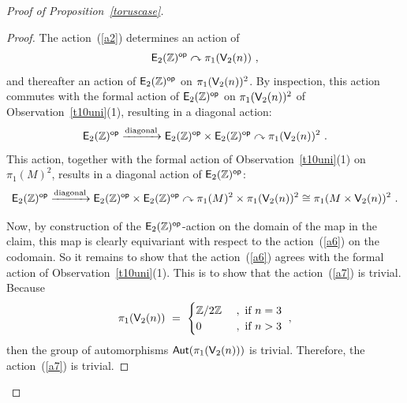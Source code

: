\begin{proof}[Proof of Proposition~\ref{toruscase}]
\begin{claim}
\end{claim}
\begin{proof}
The action~(\ref{a2}) determines an action of 
\begin{equation}
\label{a7}
\mathsf E_2(\mathbb Z)^{\operatorname{\mathsf{op}}}
\curvearrowright
\pi_1(\mathsf V_2(n))
~,
\end{equation}
and thereafter an action of $\mathsf E_2(\mathbb Z)^{\operatorname{\mathsf{op}}}$ on $\pi_1(\mathsf V_2(n))^2$.  
By inspection, this action commutes with the formal action of $\mathsf E_2(\mathbb Z)^{\operatorname{\mathsf{op}}}$ on $\pi_1(\mathsf V_2(n))^2$ of Observation~\ref{t10uni}(1), resulting in a diagonal action:
\begin{equation}
\label{a5}
\mathsf E_2(\mathbb Z)^{\operatorname{\mathsf{op}}}
\xrightarrow{\rm diagonal}
\mathsf E_2(\mathbb Z)^{\operatorname{\mathsf{op}}}
\times
\mathsf E_2(\mathbb Z)^{\operatorname{\mathsf{op}}}
\curvearrowright
\pi_1(\mathsf V_2(n))^2
~.
\end{equation}
This action, together with the formal action of Observation~\ref{t10uni}(1) on $\pi_1(M)^2$, 
results in a diagonal action of $\mathsf E_2(\mathbb Z)^{\operatorname{\mathsf{op}}}$:
\begin{equation}
\label{a6}
\mathsf E_2(\mathbb Z)^{\operatorname{\mathsf{op}}}
\xrightarrow{\rm diagonal}
\mathsf E_2(\mathbb Z)^{\operatorname{\mathsf{op}}}
\times
\mathsf E_2(\mathbb Z)^{\operatorname{\mathsf{op}}}
\curvearrowright
\pi_1(M)^2
\times
\pi_1(\mathsf V_2(n))^2
\cong
\pi_1(M\times \mathsf V_2(n))^2
~.
\end{equation}



Now, by construction of the $\mathsf E_2(\mathbb Z)^{\operatorname{\mathsf{op}}}$-action on the domain of the map in the claim, 
this map is clearly equivariant with respect to the action~(\ref{a6}) on the codomain.  
So it remains to show that the action~(\ref{a6}) agrees with the formal action of Observation~\ref{t10uni}(1).
This is to show that the action~(\ref{a7}) is trivial.  
Because
\[
\pi_1(\mathsf V_2(n))
~=~
\begin{cases}
\mathbb Z/2\mathbb Z
&
~,
\text{ if }n=3
\\
0
&
~,
\text{ if } n > 3
\end{cases}
~,
\]
then the group of automorphisms $\operatorname{\sf Aut}(\pi_1(\mathsf V_2(n)))$ is trivial.
Therefore, the action~(\ref{a7}) is trivial.  

\end{proof}



 




\end{proof}

